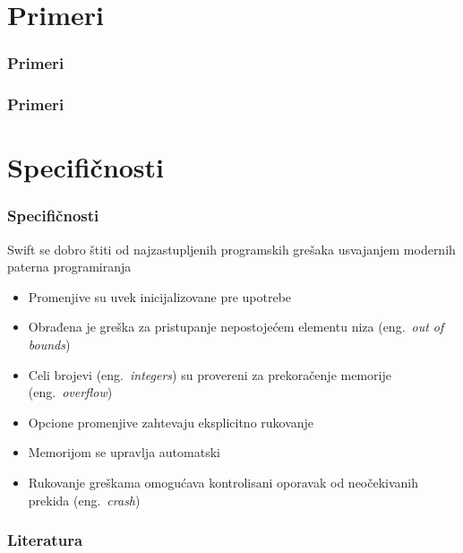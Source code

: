 \documentclass{beamer}
\begin{document}
\section{Primeri}
\begin{frame}
\frametitle{Primeri}

\end{frame}


\begin{frame}
\frametitle{Primeri}

\end{frame}
\section{Specifičnosti}
\begin{frame}
\frametitle{Specifičnosti}

Swift se dobro štiti od najzastupljenih programskih grešaka usvajanjem modernih paterna programiranja \cite{swift_sajt}
\begin{itemize}
\item Promenjive su uvek inicijalizovane pre upotrebe
\item Obrađena je greška za pristupanje nepostojećem elementu niza (eng.~{\em out of bounds})
\item Celi brojevi (eng.~{\em integers}) su provereni za prekoračenje memorije (eng.~{\em overflow})
\item Opcione promenjive zahtevaju eksplicitno rukovanje
\item Memorijom se upravlja automatski
\item Rukovanje greškama omogućava kontrolisani oporavak od neočekivanih prekida (eng.~{\em crash})
\end{itemize}

\end{frame}



\begin{frame}
\frametitle{Literatura}



\end{frame}
\end{document}
